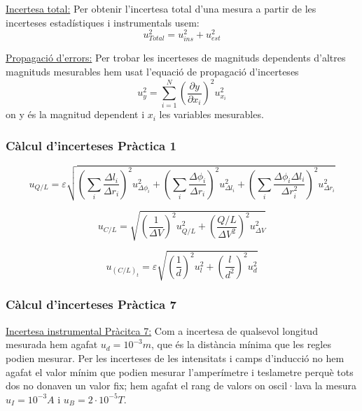 \documentclass[11pt]{article}
\numberwithin{equation}{section}
\numberwithin{figure}{section}
\numberwithin{table}{section}
\begin{document}
\underline{Incertesa total:} Per obtenir l'incertesa total d'una mesura a partir de les incerteses estadístiques i instrumentals usem:
\begin{equation} \label{eq: incertesa total}
    u_{Total}^2 = u_{ins}^2+u_{est}^2
\end{equation}

\underline{Propagació d'errors:}  Per trobar les incerteses de magnituds dependents d'altres magnituds mesurables hem usat l'equació de propagació d'incerteses
\begin{equation} \label{eq: propagació d'errors}
    u_{y}^2=\sum_{i=1}^{N}(\frac{\partial y}{\partial x_i})^2u_{x_i}^2
\end{equation}
on y és la magnitud dependent i ${x_i}$ les variables mesurables.

\subsubsection{Càlcul d'incerteses Pràctica 1}
\begin{equation}
    u_{Q/L} = \varepsilon \sqrt{
        \left( \sum_i \frac{\Delta l_i}{\Delta r_i} \right)^2 u^2_{\Delta \phi_i} +
        \left( \sum_i \frac{\Delta \phi_i}{\Delta r_i} \right)^2 u^2_{\Delta l_i} +
        \left( \sum_i \frac{\Delta \phi_i \Delta l_i}{\Delta r_i^2} \right)^2 u^2_{\Delta r_i}}
        \label{eq: ins_q}
\end{equation}


\begin{equation}
    u_{C/L} = \sqrt{
        \left( \frac{1}{\Delta V} \right)^2 u^2_{Q/L} +
        \left( \frac{Q/L}{\Delta V^2} \right)^2 u^2_{\Delta V}}
    \label{eq: ins_c}
\end{equation}

\begin{equation}
    u_{(C/L)_t} = \varepsilon \sqrt{
    \left( \frac{1}{d} \right)^2 u^2_l +
    \left( \frac{l}{d^2} \right)^2 u^2_d}
    \label{eq: ins_ct}
\end{equation}
\subsubsection{Càlcul d'incerteses Pràctica 7}\label{sec: incerteses}


\underline{Incertesa instrumental Pràcitca 7:}
Com a incertesa de qualsevol longitud mesurada hem agafat $u_d = 10^{-3}m$, que és la distància mínima que les regles podien mesurar.
Per les incerteses de les intensitats i camps d'inducció no hem agafat el valor mínim que podien mesurar l'amperímetre i teslametre perquè tots dos no donaven un valor fix; hem agafat el rang de valors on oscil·lava la mesura $u_I = 10^{-3}A$ i $u_B = 2 \cdot 10^{-5}T$.
\end{document}
